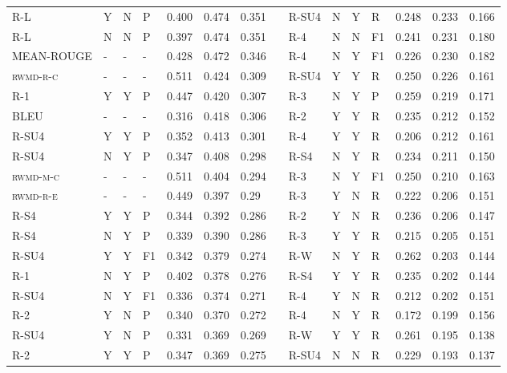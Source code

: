 \documentclass[11pt,a4paper]{article}
\begin{document}
\begin{table}[]
{\begin{tabular}{lllllllllllllll}
\textsc{R-L} & Y & N & P & 0.400 & 0.474 & 0.351 &  & \textsc{R-SU4} & N & Y & R & 0.248 & 0.233 & 0.166 \\
\textsc{R-L} & N & N & P & 0.397 & 0.474 & 0.351 &  & \textsc{R-4} & N & N & F1 & 0.241 & 0.231 & 0.180 \\
\textsc{MEAN-ROUGE} & - & - & - & 0.428 & 0.472 & 0.346 &  & \textsc{R-4} & N & Y & F1 & 0.226 & 0.230 & 0.182 \\
\textsc{rwmd-r-c} & - & - & - & 0.511 & 0.424 & 0.309 &  & \textsc{R-SU4} & Y & Y & R & 0.250 & 0.226 & 0.161 \\
\textsc{R-1} & Y & Y & P & 0.447 & 0.420 & 0.307 &  & \textsc{R-3} & N & Y & P & 0.259 & 0.219 & 0.171 \\
\textsc{BLEU} & - & - & - & 0.316 & 0.418 & 0.306 &  & \textsc{R-2} & Y & Y & R & 0.235 & 0.212 & 0.152 \\
\textsc{R-SU4} & Y & Y & P & 0.352 & 0.413 & 0.301 &  & \textsc{R-4} & Y & Y & R & 0.206 & 0.212 & 0.161 \\
\textsc{R-SU4} & N & Y & P & 0.347 & 0.408 & 0.298 &  & \textsc{R-S4} & N & Y & R & 0.234 & 0.211 & 0.150 \\
\textsc{rwmd-m-c} & - & - & - & 0.511 & 0.404 & 0.294 &  & \textsc{R-3} & N & Y & F1 & 0.250 & 0.210 & 0.163 \\
\textsc{rwmd-r-e} & - & - & - & 0.449 & 0.397 & 0.29 &  & \textsc{R-3} & Y & N & R & 0.222 & 0.206 & 0.151 \\
\textsc{R-S4} & Y & Y & P & 0.344 & 0.392 & 0.286 &  & \textsc{R-2} & Y & N & R & 0.236 & 0.206 & 0.147 \\
\textsc{R-S4} & N & Y & P & 0.339 & 0.390 & 0.286 &  & \textsc{R-3} & Y & Y & R & 0.215 & 0.205 & 0.151 \\
\textsc{R-SU4} & Y & Y & F1 & 0.342 & 0.379 & 0.274 &  & \textsc{R-W} & N & Y & R & 0.262 & 0.203 & 0.144 \\
\textsc{R-1} & N & Y & P & 0.402 & 0.378 & 0.276 &  & \textsc{R-S4} & Y & Y & R & 0.235 & 0.202 & 0.144 \\
\textsc{R-SU4} & N & Y & F1 & 0.336 & 0.374 & 0.271 &  & \textsc{R-4} & Y & N & R & 0.212 & 0.202 & 0.151 \\
\textsc{R-2} & Y & N & P & 0.340 & 0.370 & 0.272 &  & \textsc{R-4} & N & Y & R & 0.172 & 0.199 & 0.156 \\
\textsc{R-SU4} & Y & N & P & 0.331 & 0.369 & 0.269 &  & \textsc{R-W} & Y & Y & R & 0.261 & 0.195 & 0.138 \\
\textsc{R-2} & Y & Y & P & 0.347 & 0.369 & 0.275 &  & \textsc{R-SU4} & N & N & R & 0.229 & 0.193 & 0.137 \\

\end{tabular}}
\end{table}
\end{document}
